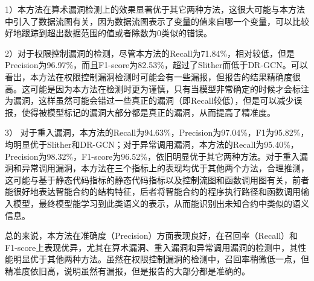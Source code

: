 1）本方法在算术漏洞检测上的效果显著优于其它两种方法，这很大可能与本方法中引入了数据流图有关，因为数据流图表示了变量的值来自哪一个变量，可以比较好地跟踪到超出数据范围的值或者除数为0类似的错误。

2）对于权限控制漏洞的检测，尽管本方法的Recall为71.84\%，相对较低，但是Precision为96.97\%，而且F1-score为82.53\%，超过了Slither而低于DR-GCN。可以看出，本方法在权限控制漏洞检测时可能会有一些漏报，但报告的结果精确度很高。这可能是因为本方法在检测时更为谨慎，只有当模型非常确定的时候才会标注为漏洞，这样虽然可能会错过一些真正的漏洞（即Recall较低），但是可以减少误报，使得被模型标记的漏洞大部分都是真正的漏洞，从而提高了精准度。





3） 对于重入漏洞，本方法的Recall为94.63\%，Precision为97.04\%，F1为95.82\%，均明显优于Slither和DR-GCN；对于异常调用漏洞，本方法的Recall为95.40\%，Precision为98.32\%，F1-score为96.52\%，依旧明显优于其它两种方法。对于重入漏洞和异常调用漏洞，本方法在三个指标上的表现均优于其他两个方法，合理推测，这可能与基于静态代码指标的静态代码指标以及控制流图和函数调用图有关，前者能很好地表达智能合约的结构特征，后者将智能合约的程序执行路径和函数调用输入模型，最终模型能学习到此类语义的表示，从而能识别出未知合约中类似的语义信息。

总的来说，本方法在准确度（Precision）方面表现良好，在召回率（Recall）和F1-score上表现优异，尤其在算术漏洞、重入漏洞和异常调用漏洞的检测中，其性能明显优于其他两种方法。虽然在权限控制漏洞的检测中，召回率稍微低一点，但精准度依旧高，说明虽然有漏报，但是报告的大部分都是准确的。

